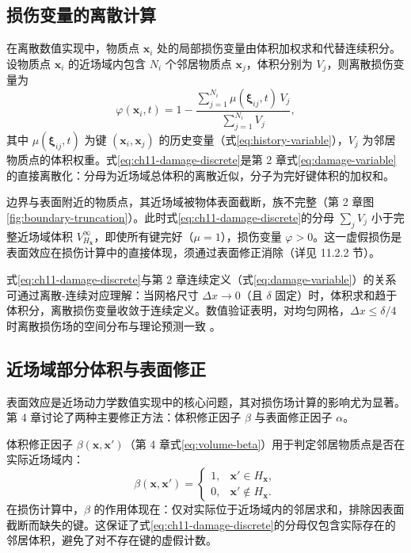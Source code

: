 \subsection{损伤变量的离散计算}\label{sec:ch11-damage-discrete}

在离散数值实现中，物质点 $\mathbf{x}_i$ 处的局部损伤变量由体积加权求和代替连续积分。设物质点 $\mathbf{x}_i$ 的近场域内包含 $N_i$ 个邻居物质点 $\mathbf{x}_j$，体积分别为 $V_j$，则离散损伤变量为
\begin{equation}
\varphi(\mathbf{x}_i,t)=1-\frac{\displaystyle\sum_{j=1}^{N_i}\mu(\boldsymbol{\xi}_{ij},t)\,V_j}
{\displaystyle\sum_{j=1}^{N_i}V_j},
\label{eq:ch11-damage-discrete}
\end{equation}
其中 $\mu(\boldsymbol{\xi}_{ij},t)$ 为键 $(\mathbf{x}_i,\mathbf{x}_j)$ 的历史变量（式\eqref{eq:history-variable}），$V_j$ 为邻居物质点的体积权重。式\eqref{eq:ch11-damage-discrete}是第 2 章式\eqref{eq:damage-variable}的直接离散化：分母为近场域总体积的离散近似，分子为完好键体积的加权和。

边界与表面附近的物质点，其近场域被物体表面截断，族不完整（第 2 章图\ref{fig:boundary-truncation}）。此时式\eqref{eq:ch11-damage-discrete}的分母 $\sum_j V_j$ 小于完整近场域体积 $V_{H_{\mathbf{x}}}^{\infty}$，即使所有键完好（$\mu=1$），损伤变量 $\varphi>0$。这一虚假损伤是表面效应在损伤计算中的直接体现，须通过表面修正消除（详见 11.2.2 节）。

式\eqref{eq:ch11-damage-discrete}与第 2 章连续定义（式\eqref{eq:damage-variable}）的关系可通过离散-连续对应理解：当网格尺寸 $\Delta x\to 0$（且 $\delta$ 固定）时，体积求和趋于体积分，离散损伤变量收敛于连续定义。数值验证表明，对均匀网格，$\Delta x\le\delta/4$ 时离散损伤场的空间分布与理论预测一致 \cite{SillingAskari2005}。

\subsection{近场域部分体积与表面修正}\label{sec:ch11-volume-correction}

表面效应是近场动力学数值实现中的核心问题，其对损伤场计算的影响尤为显著。第 4 章讨论了两种主要修正方法：体积修正因子 $\beta$ 与表面修正因子 $\alpha$。

体积修正因子 $\beta(\mathbf{x},\mathbf{x}')$（第 4 章式\eqref{eq:volume-beta}）用于判定邻居物质点是否在实际近场域内：
\begin{equation}
\beta(\mathbf{x},\mathbf{x}')=
\begin{cases}
1, & \mathbf{x}'\in H_{\mathbf{x}},\\
0, & \mathbf{x}'\notin H_{\mathbf{x}}.
\end{cases}
\label{eq:ch11-volume-beta-recall}
\end{equation}
在损伤计算中，$\beta$ 的作用体现在：仅对实际位于近场域内的邻居求和，排除因表面截断而缺失的键。这保证了式\eqref{eq:ch11-damage-discrete}的分母仅包含实际存在的邻居体积，避免了对不存在键的虚假计数。

